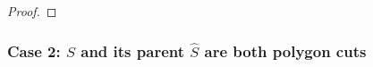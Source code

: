 \begin{proof}
%
%
%
%
%
\end{proof}



\subsubsection{Case 2: $S$ and its parent $\hat{S}$ are both polygon cuts}
\label{sec:BB}



